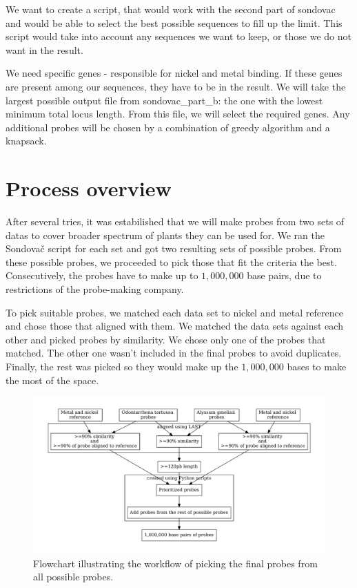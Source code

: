We want to create a script, that would work with the second part of sondovac and would be able to select the best possible 
sequences to fill up the limit. This script would take into account any sequences we want to keep, or those we do not want in 
the result. 

We need specific genes - responsible for nickel and metal binding. If these genes are present among our sequences, they have 
to be in the result. We will take the largest possible output file from sondovac\_part\_b: the one with the lowest minimum total locus length. 
From this file, we will select the required genes. Any additional probes will be chosen by a combination of greedy algorithm and a knapsack. 


\section{Process overview}
After several tries, it was estabilished that we will make probes from two sets of datas to cover broader spectrum of plants they can 
be used for. We ran the Sondovač script for each set and got two resulting sets of possible probes. From these possible probes, we 
proceeded to pick those that fit the criteria the best. Consecutively, the probes have to make up to $1,000,000$ base pairs, due to 
restrictions of the probe-making company. 

To pick suitable probes, we matched each data set to nickel and metal reference and chose those that aligned with them. We matched the 
data sets against each other and picked probes by similarity. We chose only one of the probes that matched. The other one 
wasn't included in the final probes to avoid duplicates. Finally, the rest was picked so they would make up the $1,000,000$ bases to 
make the most of the space. 


\begin{figure}
\centerline{
	\includegraphics[width=1\textwidth]{graphs/selecting_probes}
}
\caption[Workflow of picking the probes]{Flowchart illustrating the workflow of picking the final probes from all possible probes.}
\label{obr:picking_probes}
\end{figure}



